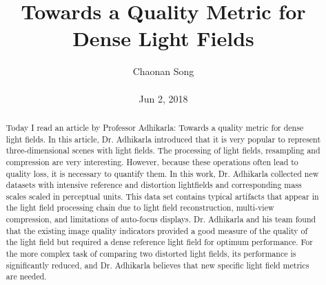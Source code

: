 \documentclass[10pt,twocolumn,letterpaper]{article}
\author{Chaonan Song \\\\
Jun 2, 2018}
\title{Towards a Quality Metric for Dense Light Fields}
\begin{document}
    \maketitle
    \begin{abstract}
        Today I read an article by Professor Adhikarla: Towards a quality metric for dense light fields. In this article, Dr. Adhikarla introduced that it is very popular to represent three-dimensional scenes with light fields. The processing of light fields, resampling and compression are very interesting. However, because these operations often lead to quality loss, it is necessary to quantify them. In this work, Dr. Adhikarla collected new datasets with intensive reference and distortion lightfields and corresponding mass scales scaled in perceptual units. This data set contains typical artifacts that appear in the light field processing chain due to light field reconstruction, multi-view compression, and limitations of auto-focus displays. Dr. Adhikarla and his team found that the existing image quality indicators provided a good measure of the quality of the light field but required a dense reference light field for optimum performance. For the more complex task of comparing two distorted light fields, its performance is significantly reduced, and Dr. Adhikarla believes that new specific light field metrics are needed.
    \end{abstract}
\end{document}
